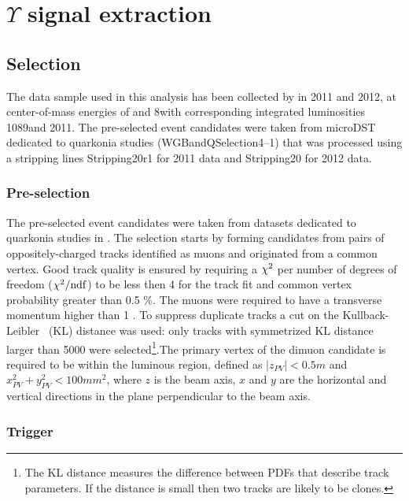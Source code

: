 \section{\texorpdfstring{$\Upsilon$}{Y} signal extraction}
\label{sec:upsilon}

\subsection{Selection}
\label{sec:ups:selelection}
The data sample used in this analysis has been collected by \lhcb in 2011 and
2012, at center-of-mass energies of \tev and 8\tev with corresponding
integrated luminosities 1089\invpb and 2011\invpb.
The pre-selected event candidates were taken from microDST dedicated to
quarkonia studies (WGBandQSelection4--1) that was processed using a 
stripping lines Stripping20r1 for 2011 data and Stripping20 for 2012 data.

\subsubsection{Pre-selection}
\label{sec:upsilon:selelection:preselection}
The pre-selected event candidates were taken from datasets dedicated to
quarkonia studies in \lhcb. The selection starts by forming candidates from
pairs of oppositely-charged tracks identified as muons and originated from a
common vertex. Good track quality is ensured by requiring a $\chi^2$ per number
of degrees of freedom ($\chi^2/\rm{ndf}$) to be less then 4 for the track fit
and common vertex probability greater than 0.5 \%. The muons were required to
have a transverse momentum higher than 1 \gevc. To suppress duplicate tracks a
cut on the Kullback-Leibler~\cite{Needham:1082460} (KL) distance was used: only
tracks with symmetrized KL distance larger than 5000 were selected\footnote{The
KL distance measures the difference between PDFs that describe track
parameters. If the distance is small then two tracks are likely to be
clones.}.The primary vertex of the dimuon candidate is required to be within the 
luminous region, defined as $|z_{PV}| < 0.5 m$ and $x_{PV}^2 + y_{PV}^2 < 100
mm^2$, where $z$ is the beam axis, $x$ and $y$ are the horizontal and vertical directions 
in the plane perpendicular to the beam axis.  
\subsubsection{Trigger}
\label{sec:upsilon:selection:trigger}

